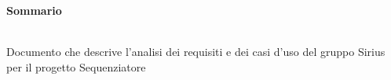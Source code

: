 \noindent\begin{Large}\textbf{Sommario}\end{Large}\\
\noindent
Documento che descrive l’analisi dei requisiti e dei casi d’uso del gruppo Sirius per il progetto Sequenziatore\\